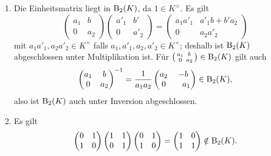 \begin{solution}
  \begin{enumerate}
    \item
      Die Einheitsmatrix liegt in $\operatorname{B}_2(K)$, da $1 \in K^\times$.
      Es gilt
      \begin{equation}
        \label{equation: product of upper triangular matrices}
        \begin{pmatrix}
          a_1 & b   \\
          0   & a_2
        \end{pmatrix}
        \begin{pmatrix}
          a'_1  & b'   \\
          0     & a'_2
        \end{pmatrix}
        =
        \begin{pmatrix}
          a_1 a'_1  & a'_1 b + b' a_2 \\
          0         & a_2 a'_2
        \end{pmatrix}
      \end{equation}
      mit $a_1 a'_1, a_2 a'_2 \in K^\times$ falls $a_1, a'_1, a_2, a'_2 \in K^\times$;
      deshalb ist $\operatorname{B}_2(K)$ abgeschlossen unter Multiplikation ist.
      Für $\begin{psmallmatrix} a_1 & b \\ 0 & a_2 \end{psmallmatrix} \in \operatorname{B}_2(K)$ gilt auch
      \[
        \begin{pmatrix}
          a_1 & b   \\
          0   & a_2
        \end{pmatrix}^{-1}
        =
        \frac{1}{a_1 a_2}
        \begin{pmatrix}
          a_2 &           -b    \\
          0   & \phantom{-}a_1
        \end{pmatrix}
        \in \operatorname{B}_2(K),
      \]
      also ist $\operatorname{B}_2(K)$ auch unter Inversion abgeschlossen.
    
    \item
      Es gilt
      \[
        \begin{pmatrix}
          0 & 1 \\
          1 & 0
        \end{pmatrix}
        \begin{pmatrix}
          1 & 1 \\
          0 & 1
        \end{pmatrix}
        \begin{pmatrix}
          0 & 1 \\
          1 & 0
        \end{pmatrix}
        =
        \begin{pmatrix}
          1 & 0 \\
          1 & 1
        \end{pmatrix}
        \notin \operatorname{B}_2(K).
      \]
      

\end{enumerate}
\end{solution}
